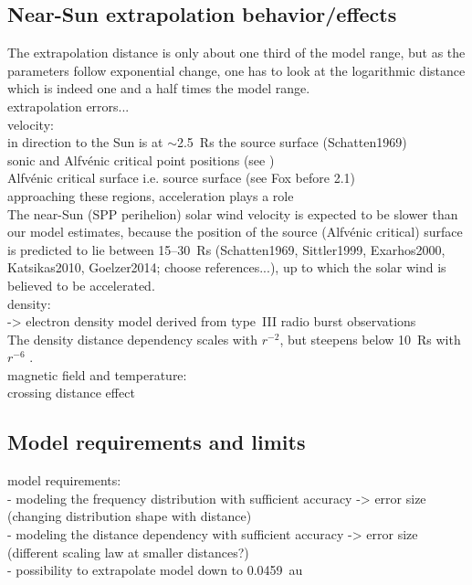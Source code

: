 \subsection{Near-Sun extrapolation behavior/effects}
The extrapolation distance is only about one third of the model range, but as the parameters follow exponential change, one has to look at the logarithmic distance which is indeed one and a half times the model range.\\

extrapolation errors...\\

velocity:\\
in direction to the Sun is at $\sim$2.5~Rs the source surface (Schatten1969)\\

sonic and Alfvénic critical point positions (see \citet{Sittler1999})\\
Alfvénic critical surface i.e. source surface (see Fox before 2.1)\\

approaching these regions, acceleration plays a role\\

The near-Sun (SPP perihelion) solar wind velocity is expected to be slower than our model estimates, because the position of the source (Alfvénic critical) surface is predicted to lie between 15--30~Rs (Schatten1969, Sittler1999, Exarhos2000, Katsikas2010, Goelzer2014; choose references...), up to which the solar wind is believed to be accelerated.\\

density:\\
\citet{Leblanc1998} -> electron density model derived from type~III radio burst observations\\
The density distance dependency scales with $r^{-2}$, but steepens below 10~Rs with $r^{-6}$ \citep{Leblanc1998}.\\

magnetic field and temperature:\\
crossing distance effect\\

\subsection{Model requirements and limits}

model requirements:\\
- modeling the frequency distribution with sufficient accuracy -> error size (changing distribution shape with distance)\\
- modeling the distance dependency with sufficient accuracy -> error size (different scaling law at smaller distances?)\\
- possibility to extrapolate model down to 0.0459~au\\

